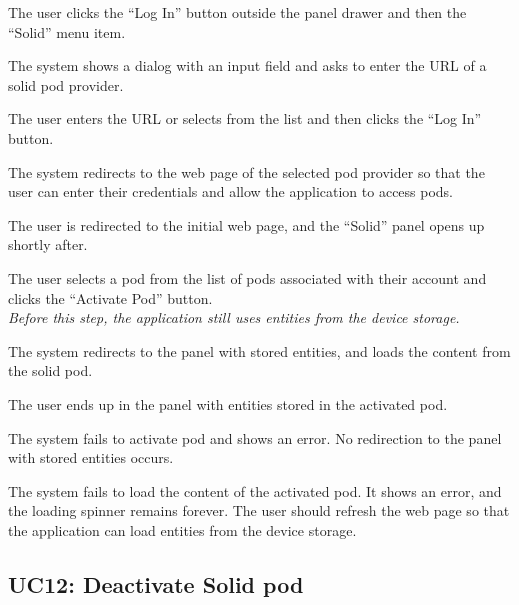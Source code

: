 
\begin{ucenumerate}
\item The user clicks the ``Log In'' button outside the panel drawer and then the ``Solid'' menu item.
\item The system shows a dialog with an input field and asks to enter the URL of a \acs{solid} pod provider.
\item The user enters the URL or selects from the list and then clicks the ``Log In'' button.
\item The system redirects to the web page of the selected pod provider so that the user can enter their credentials and allow the application to access pods.
\item The user is redirected to the initial web page, and the ``Solid'' panel opens up shortly after.
\item The user selects a pod from the list of pods associated with their account and clicks the ``Activate Pod'' button.\\[0.2em]
\emph{Before this step, the application still uses entities from the device storage.}
\item The system redirects to the panel with stored entities, and loads the content from the \acs{solid} pod.
\end{ucenumerate}


\begin{ucitemize}
\item The user ends up in the panel with entities stored in the activated pod.
\end{ucitemize}


\begin{ucitemize}
\item The system fails to activate pod and shows an error. No redirection to the panel with stored entities occurs.
\item The system fails to load the content of the activated pod. It shows an error, and the loading spinner remains forever. The user should refresh the web page so that the application can load entities from the device storage.
\end{ucitemize}

\subsection{UC12: Deactivate Solid pod}\label{sssec:uc-deactivate-solid}


